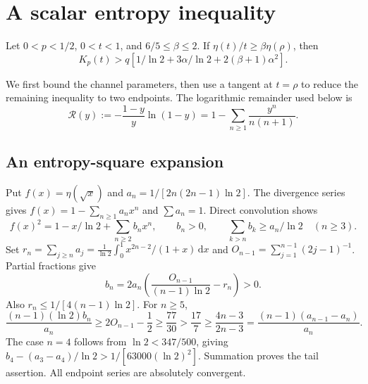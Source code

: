 \section{A scalar entropy inequality}\label{app:scalar}
\begin{lemma}\label{lem:app-product}
Let $0<p<1/2$, $0<t<1$, and $6/5\le\beta\le2$. If $\eta(t)/t\ge\beta \eta(\rho)$, then
\begin{equation}\label{eq:app-productgoal}
 K_p(t)>q[1/\ln2+3\alpha/\ln2+2(\beta+1)\alpha^2].
\end{equation}
\end{lemma}
We first bound the channel parameters, then use a tangent at $t=\rho$ to
reduce the remaining inequality to two endpoints.
The logarithmic remainder used below is
\begin{equation}\label{eq:app-remainder}
 \mathcal R(y):=-\frac{1-y}{y}\ln(1-y)
 =1-\sum_{n\ge1}\frac{y^n}{n(n+1)}.
\end{equation}

\subsection{An entropy-square expansion}
Put $f(x)=\eta(\sqrt x)$ and $a_n=1/[2n(2n-1)\ln2]$. The divergence series
gives $f(x)=1-\sum_{n\ge1}a_nx^n$ and $\sum a_n=1$. Direct convolution shows
\begin{equation}\label{eq:app-squaretails}
 f(x)^2=1-x/\ln2+\sum_{n\ge2}b_nx^n,\qquad b_n>0,\qquad
 \sum_{k>n}b_k\ge a_n/\ln2\quad(n\ge3).
\end{equation}
Set $r_n=\sum_{j\ge n}a_j=\frac1{\ln2}\int_0^1x^{2n-2}/(1+x)\,\mathrm d x$ and
$O_{n-1}=\sum_{j=1}^{n-1}(2j-1)^{-1}$. Partial fractions give
\[
 b_n=2a_n\left(\frac{O_{n-1}}{(n-1)\ln2}-r_n\right)>0.
\]
Also $r_n\le1/[4(n-1)\ln2]$. For $n\ge5$,
\[
 \frac{(n-1)(\ln2)b_n}{a_n}\ge2O_{n-1}-\frac12
 \ge\frac{77}{30}>\frac{17}{7}
 \ge\frac{4n-3}{2n-3}
 =\frac{(n-1)(a_{n-1}-a_n)}{a_n}.
\]
The case $n=4$ follows from $\ln2<347/500$, giving $b_4-(a_3-a_4)/\ln2>1/[63000(\ln2)^2]$.
Summation proves the tail assertion. All endpoint series are absolutely
convergent.

